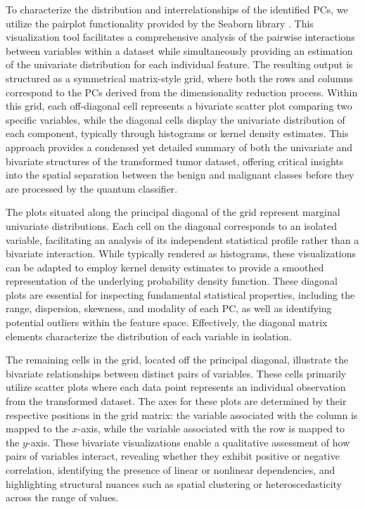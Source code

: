 \documentclass[en]{dimscthesis}
\begin{document}
To characterize the distribution and interrelationships of the identified PCs, we utilize the pairplot functionality provided by the Seaborn library \cite{bib:seaborn}. This visualization tool facilitates a comprehensive analysis of the pairwise interactions between variables within a dataset while simultaneously providing an estimation of the univariate distribution for each individual feature. The resulting output is structured as a symmetrical matrix-style grid, where both the rows and columns correspond to the PCs derived from the dimensionality reduction process. Within this grid, each off-diagonal cell represents a bivariate scatter plot comparing two specific variables, while the diagonal cells display the univariate distribution of each component, typically through histograms or kernel density estimates. This approach provides a condensed yet detailed summary of both the univariate and bivariate structures of the transformed tumor dataset, offering critical insights into the spatial separation between the benign and malignant classes before they are processed by the quantum classifier.

The plots situated along the principal diagonal of the grid represent marginal univariate distributions. Each cell on the diagonal corresponds to an isolated variable, facilitating an analysis of its independent statistical profile rather than a bivariate interaction. While typically rendered as histograms, these visualizations can be adapted to employ kernel density estimates to provide a smoothed representation of the underlying probability density function. These diagonal plots are essential for inspecting fundamental statistical properties, including the range, dispersion, skewness, and modality of each PC, as well as identifying potential outliers within the feature space. Effectively, the diagonal matrix elements characterize the distribution of each variable in isolation.

The remaining cells in the grid, located off the principal diagonal, illustrate the bivariate relationships between distinct pairs of variables. These cells primarily utilize scatter plots where each data point represents an individual observation from the transformed dataset. The axes for these plots are determined by their respective positions in the grid matrix: the variable associated with the column is mapped to the $x$-axis, while the variable associated with the row is mapped to the $y$-axis. These bivariate visualizations enable a qualitative assessment of how pairs of variables interact, revealing whether they exhibit positive or negative correlation, identifying the presence of linear or nonlinear dependencies, and highlighting structural nuances such as spatial clustering or heteroscedasticity across the range of values.
\end{document}
